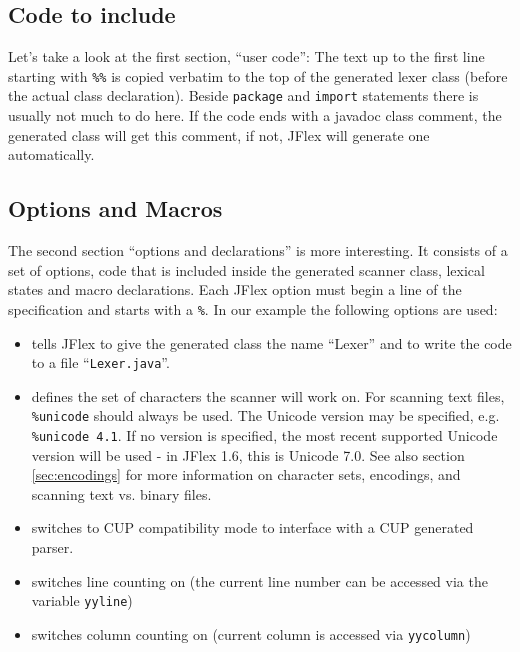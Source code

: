 \documentclass[11pt]{scrartcl}
\newcommand{\ver}{1.6}
\newcommand{\latestunicodever}{7.0}
\begin{document}
\subsection{Code to include\label{ExampleUserCode}}
Let's take a look at the first section, ``user code'': The text up to the
first line starting with \texttt{\%\%} is copied verbatim to the top 
of the generated lexer class (before the actual class declaration). 
Beside \texttt{package} and \texttt{import} statements there is usually not much 
to do here. If the code ends with a javadoc class comment, the generated class
will get this comment, if not, JFlex will generate one automatically.

\subsection{Options and Macros\label{ExampleOptions}}
The second section ``options and declarations'' is more interesting. It consists
of a set of options, code that is included inside the generated scanner
class, lexical states and macro declarations. Each JFlex option must begin
a line of the specification and starts with a \texttt{\%}. In our example
the following options are used:

\begin{itemize}
\item
  \texttt{} tells JFlex to give the
  generated class the name ``Lexer'' and to write the code to a file ``\texttt{Lexer.java}''.

\item
  \texttt{} defines the set of characters the scanner will 
  work on. For scanning text files, \texttt{\%unicode} should always be used.  The Unicode
  version may be specified, e.g. \texttt{\%unicode 4.1}.  If no version is specified, the
  most recent supported Unicode version will be used - in JFlex \ver, this is
  Unicode \latestunicodever. See also section \ref{sec:encodings} for more information
  on character sets, encodings, and scanning text vs. binary files.

\item
  \texttt{} switches to CUP compatibility
  mode to interface with a CUP generated parser.

\item
  \texttt{} switches line counting on (the
  current line number can be accessed via the variable \texttt{yyline})

\item
  \texttt{} switches column counting on
  (current column is accessed via \texttt{yycolumn})

\end{itemize}
\label{ExampleScannerCode}
\end{document}
